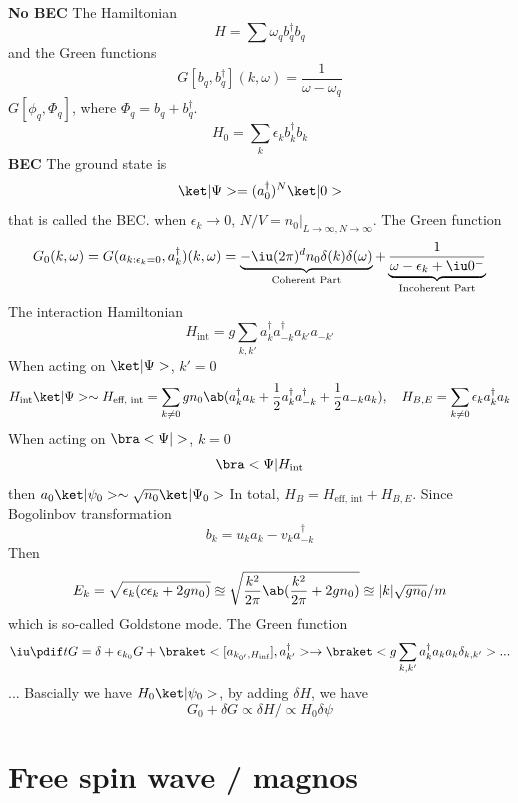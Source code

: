 \begin{example}
  \textbf{No BEC}
  The Hamiltonian
  \[
    H = \sum \omega_q b_q^\dagger b_q
  \]
  and the Green functions
  \[
    G[b_q, b_q^\dagger](k,\omega) = \frac{1}{\omega - \omega_q}
  \]
  $G[\phi_q, \Phi_q]$, where $\Phi_q = b_q + b_q^\dagger$.
  \[
    H_0 = \sum_k \epsilon_k b_k^\dagger b_k
  \]
  \textbf{BEC}
  The ground state is
  \[
    \ket|\Psi> = (a_0^\dagger)^N \ket|0>
  \]
  that is called the BEC.
  when $\epsilon_k \to 0$, $N/V = n_0\big|_{L\to\infty, N\to\infty}$.
  The Green function
  \[
    G_0(k,\omega) = G(a_{k:\epsilon_k = 0}, a_k^\dagger) (k,\omega)
  = \underbrace{-\iu(2\pi)^d n_0 \delta(k) \delta(\omega)}_\text{Coherent Part} + \underbrace{\frac1{\omega - \epsilon_k + \iu0^-}}_\text{Incoherent Part}
  \]
  The interaction Hamiltonian
  \[
    H_\text{int} = g\sum_{k,k'} a_k^\dagger a_{-k}^\dagger a_{k'} a_{-k'}
  \]
  When acting on $\ket|\Psi>$, $k' = 0$
  \[
    H_\text{int} \ket|\Psi> \sim
    H_\text{eff, int} = \sum_{k\neq0} g n_0 \ab(a_k^\dagger a_k + \frac12 a_k^\dagger a_{-k}^\dagger + \frac12a_{-k}a_k), \quad
    H_{B,E} = \sum_{k\neq0} \epsilon_k a_k^\dagger a_k
  \]
  When acting on $\bra<\Psi|>$, $k = 0$
  \[
    \bra<\Psi|H_\text{int}
  \]
  then $a_0\ket|\psi_0> \sim \sqrt{n_0}\ket|\Psi_0>$
  In total, $H_B = H_\text{eff, int} + H_{B, E}$.
  Since Bogolinbov transformation
  \[
  b_k = u_ka_k - v_ka_{-k}^\dagger
  \]
  Then
  \[
    E_k = \sqrt{\epsilon_k(c\epsilon_k + 2gn_0)} \approxeq \sqrt{\frac{k^2}{2\pi}\ab(\frac{k^2}{2\pi} + 2gn_0)} \approxeq |k| \sqrt{gn_0}/m
  \]
  which is so-called Goldstone mode.
  The Green function
  \[
    \iu \pdif t G = \delta + \epsilon_{k_0}G + \braket<[a_{k_{0'}, H_\text{inf}}], a_{k'}^\dagger> \to
    \braket<g\sum_{k,k'} a_k^\dagger a_k a_k \delta_{k,k'}> ...
  \]
  ...
  Bascially we have $H_0 \ket|\psi_0>$,
  by adding $\delta H$, we have
  \[
    G_0 + \delta G \propto \delta H / \propto H_0 \delta\psi
  \]
\end{example}

\section{Free spin wave / magnos}

